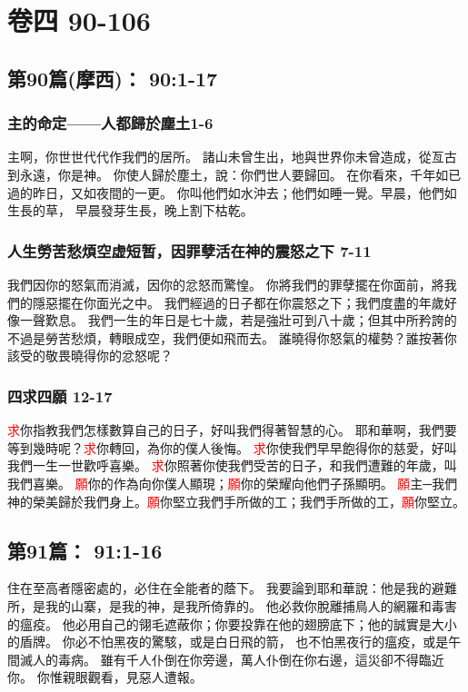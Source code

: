 \section{卷四 90-106}
\subsection{第90篇(摩西)：   90:1-17}
\subsubsection{主的命定——人都歸於塵土1-6}
主啊，你世世代代作我們的居所。
諸山未曾生出，地與世界你未曾造成，從亙古到永遠，你是神。
你使人歸於塵土，說：你們世人要歸回。
在你看來，千年如已過的昨日，又如夜間的一更。
你叫他們如水沖去；他們如睡一覺。早晨，他們如生長的草，
早晨發芽生長，晚上割下枯乾。
\subsubsection{人生勞苦愁煩空虚短暂，因罪孽活在神的震怒之下 7-11}
我們因你的怒氣而消滅，因你的忿怒而驚惶。
你將我們的罪孽擺在你面前，將我們的隱惡擺在你面光之中。
我們經過的日子都在你震怒之下；我們度盡的年歲好像一聲歎息。
我們一生的年日是七十歲，若是強壯可到八十歲；但其中所矜誇的不過是勞苦愁煩，轉眼成空，我們便如飛而去。
誰曉得你怒氣的權勢？誰按著你該受的敬畏曉得你的忿怒呢？
\subsubsection{四求四願 12-17}
\textcolor{red}{求}你指教我們怎樣數算自己的日子，好叫我們得著智慧的心。
耶和華啊，我們要等到幾時呢？\textcolor{red}{求}你轉回，為你的僕人後悔。
\textcolor{red}{求}你使我們早早飽得你的慈愛，好叫我們一生一世歡呼喜樂。
\textcolor{red}{求}你照著你使我們受苦的日子，和我們遭難的年歲，叫我們喜樂。
\textcolor{red}{願}你的作為向你僕人顯現；\textcolor{red}{願}你的榮耀向他們子孫顯明。
\textcolor{red}{願}主─我們神的榮美歸於我們身上。\textcolor{red}{願}你堅立我們手所做的工；我們手所做的工，\textcolor{red}{願}你堅立。

\subsection{第91篇：   91:1-16}
住在至高者隱密處的，必住在全能者的蔭下。
我要論到耶和華說：他是我的避難所，是我的山寨，是我的神，是我所倚靠的。
他必救你脫離捕鳥人的網羅和毒害的瘟疫。
他必用自己的翎毛遮蔽你；你要投靠在他的翅膀底下；他的誠實是大小的盾牌。
你必不怕黑夜的驚駭，或是白日飛的箭，
也不怕黑夜行的瘟疫，或是午間滅人的毒病。
雖有千人仆倒在你旁邊，萬人仆倒在你右邊，這災卻不得臨近你。
你惟親眼觀看，見惡人遭報。

